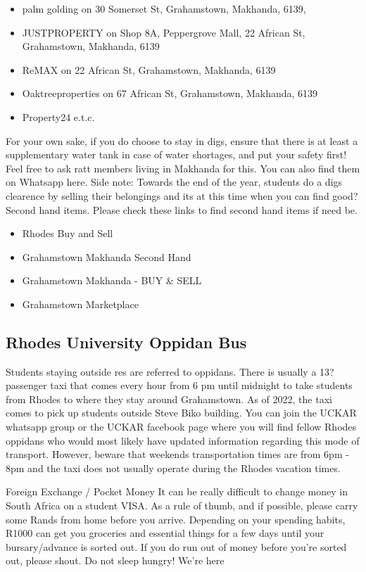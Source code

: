 \begin{itemize}
    \item palm golding on 30 Somerset St, Grahamstown, Makhanda, 6139, 
    \item JUSTPROPERTY on Shop 8A, Peppergrove Mall, 22 African St, Grahamstown, Makhanda, 6139 
    \item ReMAX on 22 African St, Grahamstown, Makhanda, 6139
    \item Oaktreeproperties on 67 African St, Grahamstown, Makhanda, 6139
    \item Property24 e.t.c.
\end{itemize}
For your own sake, if you do choose to stay in digs, ensure that there is at least a supplementary water tank in case of water shortages, and put your safety first! Feel free to ask ratt members living in Makhanda for this. You can also find them on Whatsapp here. 
Side note: Towards the end of the year, students do a digs clearence by selling their belongings and its at this time when you can find good? Second hand items. Please check these links to find second hand items if need be. 
\begin{itemize}
    \item Rhodes Buy and Sell
    \item Grahamstown Makhanda Second Hand
    \item Grahamstown Makhanda - BUY \& SELL
    \item Grahamstown Marketplace
\end{itemize}


\subsection{Rhodes University Oppidan Bus}
Students staying outside res are referred to oppidans. There is usually a 13? passenger taxi that comes every hour from 6 pm until midnight to take students from Rhodes to where they stay around Grahamstown. As of 2022, the taxi comes to pick up students outside Steve Biko building. You can join the UCKAR whatsapp group or the UCKAR facebook page where you will find fellow Rhodes oppidans who would most likely have updated information regarding this mode of transport. However, beware that weekends transportation times are from 6pm - 8pm and the taxi does not usually operate during the Rhodes vacation times.  

Foreign Exchange / Pocket Money
It can be really difficult to change money in South Africa on a student VISA. As a rule of thumb, and if possible, please carry some Rands from home before you arrive. Depending on your spending habits, R1000 can get you groceries and essential things for a few days until your bursary/advance is sorted out. If you do run out of money before you’re sorted out, please shout. Do not sleep hungry! We’re here

